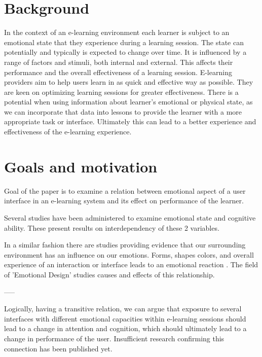 

\pagebreak


\section{Background}

In the context of an e-learning environment each learner is subject to an emotional state that they experience during a learning session. 
The state can potentially and typically is expected to change over time. 
It is influenced by a range of factors and stimuli, both internal and external. 
This affects their performance and the overall effectiveness of a learning session.
E-learning providers aim to help users learn in as quick and effective way as possible. 
They are keen on optimizing learning sessions for greater effectiveness. 
There is a potential when using information about learner's emotional or physical state, as we can incorporate that data into lessons to provide the learner with a more appropriate task or interface. 
Ultimately this can lead to a better experience and effectiveness of the e-learning experience.

\section{Goals and motivation}

Goal of the paper is to examine a relation between emotional aspect of a user interface in an e-learning system and its effect on performance of the learner.

Several studies have been administered to examine emotional state and cognitive ability.  
These present results on interdependency of these 2 variables. \citationneeded

In a similar fashion there are studies providing evidence that our surrounding environment has an influence on our emotions. \cite{Johnson2000, Arockiam2013}
Forms, shapes colors, and overall experience of an interaction or interface leads to an emotional reaction \cite{Bertamini2013}.
The field of 'Emotional Design' studies causes and effects of this relationship.

-----

Logically, having a transitive relation, we can argue that exposure to several interfaces with different emotional capacities within e-learning sessions should lead to a change in attention and cognition, which should ultimately lead to a change in performance of the user.
Insufficient research confirming this connection has been published yet.

